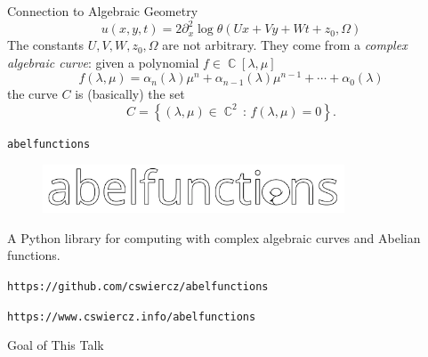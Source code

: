 \documentclass{beamer}
\DeclareMathOperator{\CC}{\mathbb{C}}
\begin{document}



\begin{frame}{Connection to Algebraic Geometry}{}
  \[
    u(x,y,t) = 2 \partial_x^2 \log
    \theta(Ux + Vy + Wt + z_0, \Omega)
  \]
  The constants $U,V,W,z_0,\Omega$ are not arbitrary. They come from a
  {\it complex algebraic curve}: given a polynomial $f \in
  \CC[\lambda,\mu]$
  \[
      f(\lambda,\mu) =
      \alpha_n(\lambda)\mu^n +
      \alpha_{n-1}(\lambda)\mu^{n-1} +
      \cdots +
      \alpha_0(\lambda)
  \]
  the curve $C$ is (basically) the set
  \[
  C = \left\{ (\lambda,\mu) \in \CC^2 \, : \, f(\lambda,\mu) = 0 \right\}.
  \]
\end{frame}



\begin{frame}{\tt abelfunctions}{}
  \begin{block}{}
  \begin{figure}[t]
    \centering
    \includegraphics[width=0.8\textwidth]{./images/abelfunctions.png}
  \end{figure}
  \end{block}

  \vspace{16pt}

  A Python library for computing with complex algebraic curves and
  Abelian functions.
  \begin{center}
    {\tt https://github.com/cswiercz/abelfunctions}

    {\tt https://www.cswiercz.info/abelfunctions}

  \end{center}
\end{frame}



\begin{frame}{Goal of This Talk}{}
  \tableofcontents
\end{frame}
\end{document}
